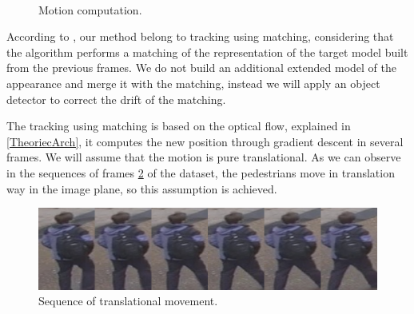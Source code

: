 \documentclass[12pt, a4paper, titlepage,twoside,openright]{article}
\begin{document}
\begin{figure}[H]
		
\centering

\\


\caption{Motion computation.}
\label{tracker1}
\end{figure}



According to \cite{visualTrackingSurvey}, our method belong to tracking using matching, considering that the algorithm performs a matching of the representation of the target model built from the previous frames. We do not build an additional extended model of the appearance and merge it with the matching, instead we will apply an object detector to correct the drift of the matching.


The tracking using matching is based on the optical flow, explained in \ref{TheoriecArch}, it computes the new position through gradient descent in several frames. We will assume that the motion is pure translational. As we can observe in the sequences of frames \ref{track1w} of the dataset, the pedestrians move in translation way in the image plane, so this assumption is achieved. 


\begin{figure}[H]
\centering         
\includegraphics[width=0.9\linewidth]{changeCamera/tomeu.png}
\caption{Sequence of translational movement.} \label{track1w}
\end{figure}
\end{document}
